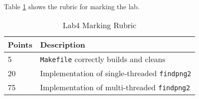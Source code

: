 Table \ref{tb_lab4_rubric} shows the rubric for marking the lab.

\begin{table}[ht]
\begin{center}
\begin{tabular}{|p{2cm}|p{12cm}|}
\hline
Points &Description  \\ \hline
5  & \verb+Makefile+ correctly builds and cleans \\ \hline
20 & Implementation of single-threaded \verb+findpng2+ \\ \hline
75    & Implementation of multi-threaded \verb+findpng2+ \\ \hline
\end{tabular}
\caption{Lab4 Marking Rubric}
\label{tb_lab4_rubric}
\end{center}
\end{table}

